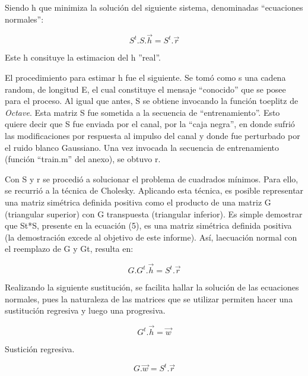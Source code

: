 \documentclass{article}
\begin{document}
\begin{multicols}{2}
\par Siendo h que minimiza la solución del siguiente sistema, denominadas “ecuaciones normales”:

\begin{equation}
\label{eq5}
S^t.S.\vec{h} = S^t.\vec{r}
\end{equation}

\par Este h consituye la estimacion del h ”real”. 
\par El procedimiento para estimar h fue el siguiente. Se tomó como s una cadena random, de longitud E, el cual constituye el mensaje “conocido” que se posee para el proceso. Al igual que antes, S se obtiene invocando la función toeplitz de \textit{Octave}. Esta matriz S fue sometida a la secuencia de “entrenamiento”. Esto quiere decir que S fue enviada por el canal, por la “caja negra”, en donde sufrió las modificaciones por respuesta al impulso del canal y donde fue perturbado por el ruido blanco Gaussiano. Una vez invocada la secuencia de entrenamiento (función “train.m” del anexo), se obtuvo r. 
\par Con S y r se procedió a solucionar el problema de cuadrados mínimos. Para ello, se recurrió a la técnica de Cholesky. Aplicando esta técnica, es posible representar una matriz simétrica definida positiva como el producto de una matriz G (triangular superior) con G transpuesta (triangular inferior). Es simple demostrar que St*S, presente en la ecuación (5), es una matriz simétrica definida positiva (la demostración excede al objetivo de este informe). Así, laecuación normal con el reemplazo de G y Gt, resulta en:

\begin{equation}
\label{eq5}
G.G^t.\vec{h} = S^t.\vec{r}
\end{equation}

\par Realizando la siguiente sustitución, se facilita hallar la solución de las ecuaciones normales, pues la naturaleza de las matrices que se utilizar permiten hacer una sustitución regresiva y luego una progresiva.

\begin{equation}
\label{eq6}
G^t.\vec{h} = \vec{w}
\end{equation}

\par Sustición regresiva.

\begin{equation}
\label{eq7}
G.\vec{w} = S^t.\vec{r}
\end{equation}


\end{multicols}
\end{document}
